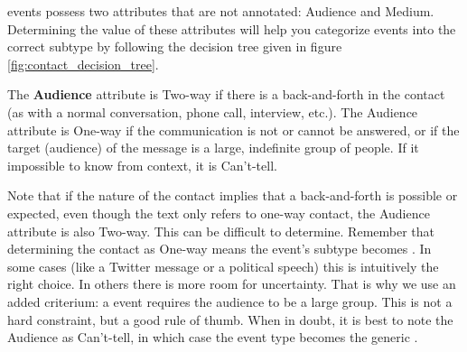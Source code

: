 events possess two attributes that are not annotated: Audience and Medium. Determining the value of these attributes will help you categorize  events into the correct subtype by following the decision tree given in figure \ref{fig:contact_decision_tree}.

The \textbf{Audience} attribute is Two-way if there is a back-and-forth in the contact (as with a normal conversation, phone call, interview, etc.). The Audience attribute is One-way if the communication is not or cannot be answered, or if the target (audience) of the message is a large, indefinite group of people. If it impossible to know from context, it is Can't-tell. 

Note that if the nature of the contact implies that a back-and-forth is possible or expected, even though the text only refers to one-way contact, the Audience attribute is also Two-way. This can be difficult to determine. Remember that determining the contact as One-way means the event's subtype becomes . In some cases (like a Twitter message or a political speech) this is intuitively the right choice. In others there is more room for uncertainty. That is why we use an added criterium: a  event requires the audience to be a large group. This is not a hard constraint, but a good rule of thumb. When in doubt, it is best to note the Audience as Can't-tell, in which case the event type becomes the generic .

